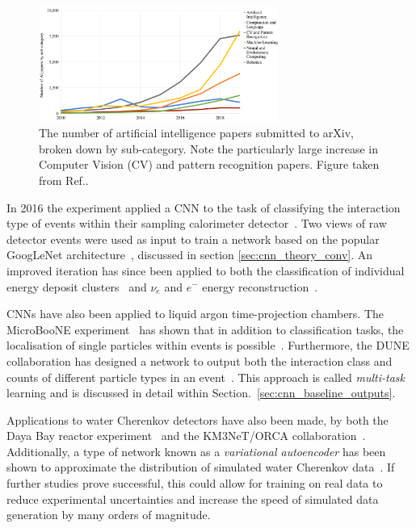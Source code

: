 \begin{figure} %
    \includegraphics[width=0.7\textwidth]{diagrams/6-cnn/papers.png}
    \caption[The number of artificial intelligence papers submitted to arXiv]
    {The number of artificial intelligence papers submitted to arXiv, broken down by sub-category.
        Note the particularly large increase in Computer Vision (CV) and pattern recognition
        papers. Figure taken from Ref.\cite{perrault2019}.}
    \label{fig:papers}
\end{figure}

In 2016 the \nova experiment applied a CNN to the task of classifying the interaction type of
events within their sampling calorimeter detector~\cite{aurisano2016}. Two views of raw detector
events were used as input to train a network based on the popular GoogLeNet
architecture~\cite{szegedy2015}, discussed in section \ref{sec:cnn_theory_conv}. An improved
iteration has since been applied to both the classification of individual energy deposit
clusters~\cite{psihas2019} and $\nu_{e}$ and $e^{-}$ energy reconstruction~\cite{baldi2019}.

CNNs have also been applied to liquid argon time-projection chambers. The MicroBooNE
experiment~\cite{acciarri2017_ref} has shown that in addition to classification tasks, the
localisation of single particles within events is possible~\cite{acciarri2017}. Furthermore, the
DUNE collaboration has designed a network to output both the interaction class and counts of
different particle types in an event~\cite{collaboration2020, abi2020}. This approach is called
\emph{multi-task} learning and is discussed in detail within
Section.~\ref{sec:cnn_baseline_outputs}.

Applications to water Cherenkov detectors have also been made, by both the Daya Bay reactor
experiment~\cite{racah2016} and the KM3NeT/ORCA collaboration~\cite{aiello2020}. Additionally, a
type of network known as a \emph{variational autoencoder} has been shown to approximate the
distribution of simulated water Cherenkov data~\cite{abhishek2019}. If further studies prove
successful, this could allow for training on real data to reduce experimental uncertainties and
increase the speed of simulated data generation by many orders of magnitude.

